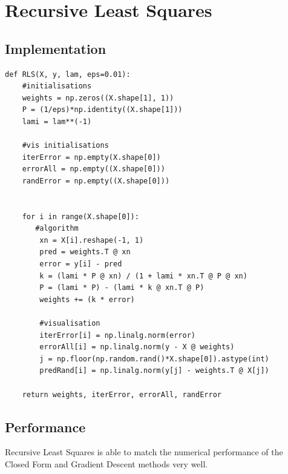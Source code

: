 \documentclass[sigconf]{acmart}
\begin{document}
\section{Recursive Least Squares}
\subsection{Implementation}
\begin{listing}[H]
    \begin{verbatim}
def RLS(X, y, lam, eps=0.01):
    #initialisations
    weights = np.zeros((X.shape[1], 1))
    P = (1/eps)*np.identity((X.shape[1]))
    lami = lam**(-1)

    #vis initialisations
    iterError = np.empty(X.shape[0])
    errorAll = np.empty((X.shape[0]))
    randError = np.empty((X.shape[0]))
    

    for i in range(X.shape[0]):
       #algorithm
        xn = X[i].reshape(-1, 1)
        pred = weights.T @ xn 
        error = y[i] - pred
        k = (lami * P @ xn) / (1 + lami * xn.T @ P @ xn)
        P = (lami * P) - (lami * k @ xn.T @ P)  
        weights += (k * error)
        
        #visualisation
        iterError[i] = np.linalg.norm(error)
        errorAll[i] = np.linalg.norm(y - X @ weights)
        j = np.floor(np.random.rand()*X.shape[0]).astype(int)
        predRand[i] = np.linalg.norm(y[j] - weights.T @ X[j])
        
    return weights, iterError, errorAll, randError
    \end{verbatim}
\end{listing}

\subsection{Performance}
Recursive Least Squares is able to match the numerical performance of the Closed Form and Gradient Descent methods very well.
\end{document}
